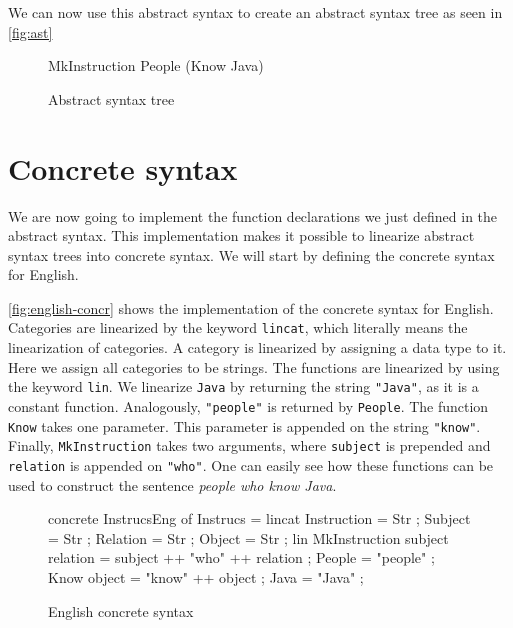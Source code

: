 We can now use this abstract syntax to create an abstract syntax tree as seen in \autoref{fig:ast}

\begin{figure}[h]
\begin{plaintext}
MkInstruction People (Know Java)
\end{plaintext}
\caption{Abstract syntax tree\label{fig:ast}}
\end{figure}

\section{Concrete syntax}

We are now going to implement the function declarations we just defined in the abstract syntax. This implementation makes it possible to linearize abstract syntax trees into concrete syntax. We will start by defining the concrete syntax for English.


\autoref{fig:english-concr} shows the implementation of the concrete syntax for English. Categories are linearized by the keyword \texttt{lincat}, which literally means the linearization of categories. A category is linearized by assigning a data type to it. Here we assign all categories to be strings. The functions are linearized by using the keyword \texttt{lin}. We linearize \texttt{Java} by returning the string \texttt{"Java"}, as it is a constant function. Analogously, \texttt{"people"} is returned by \texttt{People}. The function \texttt{Know} takes one parameter. This parameter is appended on the string \texttt{"know"}. Finally, \texttt{MkInstruction} takes two arguments, where \texttt{subject} is prepended and \texttt{relation} is appended on \texttt{"who"}. One can easily see how these functions can be used to construct the sentence \emph{people who know Java}.

\newenvironment{myfont}{\myfont}{\par}

\begin{figure}[h]
\begin{code}
concrete InstrucsEng of Instrucs = {
  lincat
    Instruction = Str ;
    Subject = Str ;
    Relation = Str ;
    Object = Str ;
  lin
    MkInstruction subject relation = subject ++ "who" ++ relation ;
    People = "people" ;
    Know object = "know" ++ object ;
    Java = "Java" ;
}
\end{code}
\caption{English concrete syntax\label{fig:english-concr}}
\end{figure}

